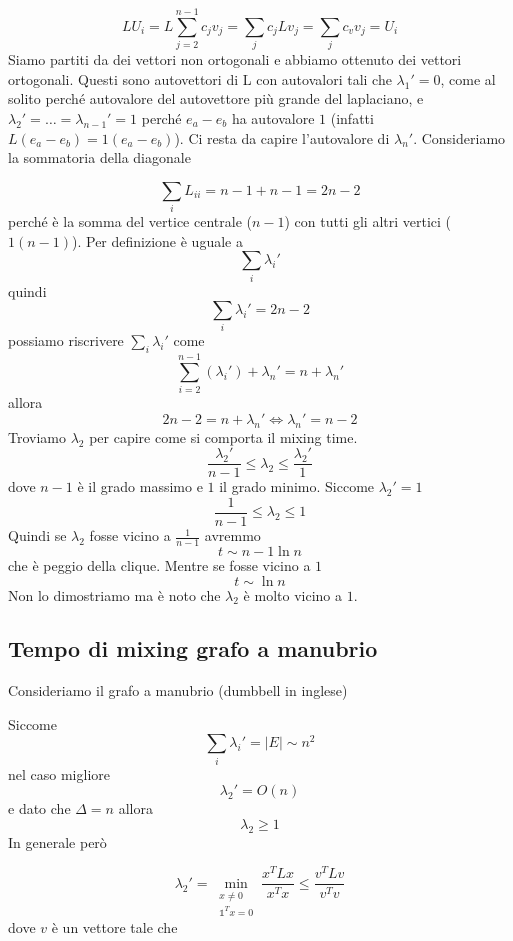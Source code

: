 \documentclass[12pt]{report}
\begin{document}
$$LU_i = L \sum_{j=2}^{n-1}c_jv_j = \sum_j c_j L v_j = \sum_j c_v v_j = U_i$$
Siamo partiti da dei vettori non ortogonali e abbiamo ottenuto dei vettori ortogonali. Questi sono autovettori di L con autovalori tali che $\lambda_1'=0$, come al solito perché autovalore del autovettore più grande del laplaciano,  e $\lambda_2' = \dots = \lambda_{n-1}' = 1$ perché $e_a - e_b$ ha autovalore $1$ (infatti $L(e_a-e_b) = 1 (e_a-e_b)$). Ci resta da capire l'autovalore di $\lambda_n'$. Consideriamo la sommatoria della diagonale

$$\sum_i L_{ii} = n - 1 + n -1=2n -2 $$
perché è la somma del vertice centrale ($n-1$) con tutti gli altri vertici ($1(n-1)$).
Per definizione è uguale a
$$\sum_i \lambda_i'$$
quindi
$$\sum_i \lambda_i' = 2n - 2$$
possiamo riscrivere $\sum_i \lambda_i'$ come
$$\sum_{i = 2}^{n-1} (\lambda_i') + \lambda_n' = n + \lambda_n'$$
allora
$$2n-2 = n + \lambda_n' \Leftrightarrow \lambda_n' = n-2$$
Troviamo $\lambda_2$ per capire come si comporta il mixing time.
$$\frac{\lambda_2'}{n-1} \leq \lambda_2 \leq \frac{\lambda_2'}{1}$$
dove $n-1$ è il grado massimo e $1$ il grado minimo. Siccome $\lambda_2' = 1$
$$\frac{1}{n-1} \leq \lambda_2 \leq 1$$
Quindi se $\lambda_2$ fosse vicino a $\frac{1}{n-1}$ avremmo
$$t \sim n-1 \ln{n}$$
che è peggio della clique. Mentre se fosse vicino a $1$
$$t \sim \ln{n}$$
Non lo dimostriamo ma è noto che $\lambda_2$ è molto vicino a $1$.
\subsection{Tempo di mixing grafo a manubrio}
Consideriamo il grafo a manubrio (dumbbell in inglese)


Siccome
$$\sum_i \lambda_i' = |E| \sim n^2$$
nel caso migliore
$$\lambda_2' = O(n)$$
e dato che $\Delta = n$ allora
$$\lambda_2 \geq 1$$
In generale però

$$\lambda_2' = \min_{\substack{x \neq 0 \\ \mathds{1}^Tx = 0}} \frac{x^TLx}{x^Tx} \leq \frac{v^T L v}{v^T v}$$
dove $v$ è un vettore tale che 
\end{document}

